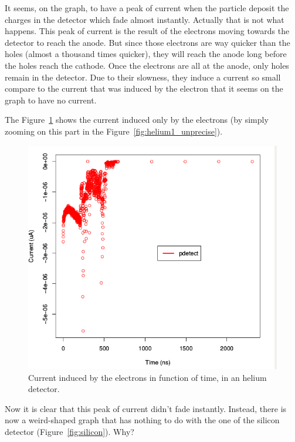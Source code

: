 \documentclass[11pt]{article}
\begin{document}
			It seems, on the graph, to have a peak of current when the particle deposit the charges in the
			detector which fade almost instantly. Actually that is not what happens. This peak of current
			is the result of the electrons moving towards the detector to reach the anode. But since those
			electrons are way quicker than the holes (almost a thousand times quicker), they will reach the
			anode long before the holes reach the cathode. Once the electrons are all at the anode, only holes
			remain in the detector. Due to their slowness, they induce a current so small compare to the
			current that was induced by the electron that it seems on the graph to have no current.

			The Figure~\ref{fig:helium1_precise} shows the current induced only by the electrons (by simply zooming
			on this part in the Figure~\ref{fig:helium1_unprecise}).

			\begin{figure}[H]
			  \center
			  \includegraphics[scale=0.5]{images/applications/helium1_precise.png}
			  \caption{Current induced by the electrons in function of time, in an helium detector.}
			  \label{fig:helium1_precise}
			\end{figure}

			Now it is clear that this peak of current didn't fade instantly. Instead, there is now a weird-shaped
			graph that has nothing to do with the one of the silicon detector (Figure~\ref{fig:silicon}). Why?
\end{document}
